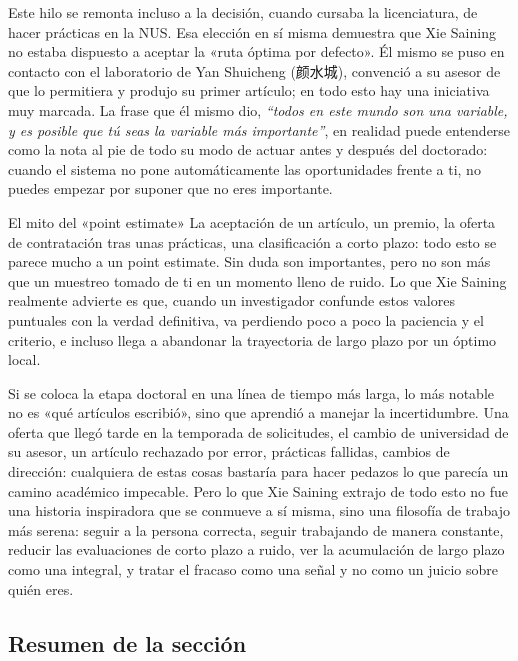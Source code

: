 \documentclass[a4paper,12pt]{article}
\begin{document}
Este hilo se remonta incluso a la decisión, cuando cursaba la licenciatura, de hacer prácticas en la NUS. Esa elección en sí misma demuestra que Xie Saining no estaba dispuesto a aceptar la «ruta óptima por defecto». Él mismo se puso en contacto con el laboratorio de Yan Shuicheng (颜水城), convenció a su asesor de que lo permitiera y produjo su primer artículo; en todo esto hay una iniciativa muy marcada. La frase que él mismo dio, \textit{``todos en este mundo son una variable, y es posible que tú seas la variable más importante''}, en realidad puede entenderse como la nota al pie de todo su modo de actuar antes y después del doctorado: cuando el sistema no pone automáticamente las oportunidades frente a ti, no puedes empezar por suponer que no eres importante.

\begin{warningbox}{El mito del «point estimate»}
La aceptación de un artículo, un premio, la oferta de contratación tras unas prácticas, una clasificación a corto plazo: todo esto se parece mucho a un point estimate. Sin duda son importantes, pero no son más que un muestreo tomado de ti en un momento lleno de ruido. Lo que Xie Saining realmente advierte es que, cuando un investigador confunde estos valores puntuales con la verdad definitiva, va perdiendo poco a poco la paciencia y el criterio, e incluso llega a abandonar la trayectoria de largo plazo por un óptimo local.
\end{warningbox}

Si se coloca la etapa doctoral en una línea de tiempo más larga, lo más notable no es «qué artículos escribió», sino que aprendió a manejar la incertidumbre. Una oferta que llegó tarde en la temporada de solicitudes, el cambio de universidad de su asesor, un artículo rechazado por error, prácticas fallidas, cambios de dirección: cualquiera de estas cosas bastaría para hacer pedazos lo que parecía un camino académico impecable. Pero lo que Xie Saining extrajo de todo esto no fue una historia inspiradora que se conmueve a sí misma, sino una filosofía de trabajo más serena: seguir a la persona correcta, seguir trabajando de manera constante, reducir las evaluaciones de corto plazo a ruido, ver la acumulación de largo plazo como una integral, y tratar el fracaso como una señal y no como un juicio sobre quién eres.

\subsection{Resumen de la sección}
\end{document}
